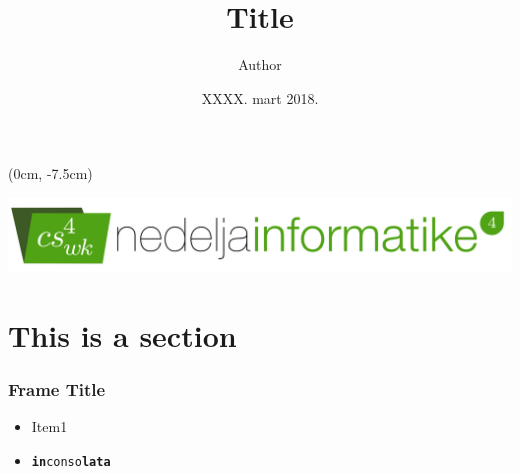 \documentclass[11pt, compress]{beamer}
\title{Title}
\author[\textcolor{white}{Author}]{Author}
\date{XXXX. mart 2018.}
\institute{Matemati\v{c}ka gimnazija\\[0.5ex]\textcolor{uorange}{\scshape Nedelja$_\text{informatike}^4$}}
\begin{document}
{
	\begin{frame}
		\titlepage
		\begin{textblock*}{\linewidth}(0cm, -7.5cm)
		\begin{center}
			\includegraphics[width=0.6\linewidth]{logo-v4.png}
		\end{center}	
		\end{textblock*}
	\end{frame}
}


\section{This is a section}

\begin{frame}
    \frametitle{Frame Title}
    \begin{itemize}
        \item Item1
        \item \texttt{\textbf{in}conso\textbf{lata}}
    \end{itemize}
\end{frame}
\end{document}
